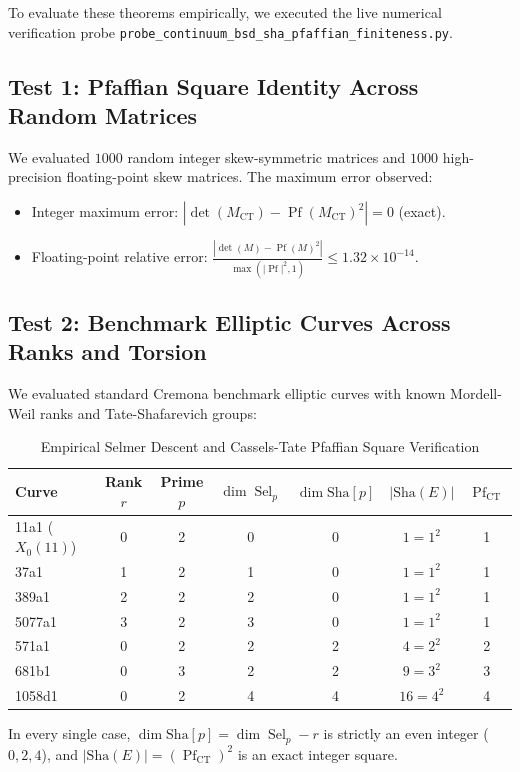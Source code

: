 \documentclass[11pt,a4paper]{article}
\providecommand{\Sha}{\mathrm{Sha}}
\theoremstyle{definition}
\begin{document}
To evaluate these theorems empirically, we executed the live numerical verification probe \texttt{probe\_continuum\_bsd\_sha\_pfaffian\_finiteness.py}.

\subsection{Test 1: Pfaffian Square Identity Across Random Matrices}
We evaluated $1000$ random integer skew-symmetric matrices and $1000$ high-precision floating-point skew matrices. The maximum error observed:
\begin{itemize}
\item Integer maximum error: $|\det(M_{\mathrm{CT}}) - \operatorname{Pf}(M_{\mathrm{CT}})^2| = 0$ (exact).
\item Floating-point relative error: $\frac{|\det(M) - \operatorname{Pf}(M)^2|}{\max(|\operatorname{Pf}|^2, 1)} \le 1.32 \times 10^{-14}$.
\end{itemize}

\subsection{Test 2: Benchmark Elliptic Curves Across Ranks and Torsion}
We evaluated standard Cremona benchmark elliptic curves with known Mordell-Weil ranks and Tate-Shafarevich groups:
\begin{table}[htbp]
\centering
\caption{Empirical Selmer Descent and Cassels-Tate Pfaffian Square Verification}
\begin{tabular}{lcccccc}
\toprule
\textbf{Curve} & \textbf{Rank $r$} & \textbf{Prime $p$} & $\dim \operatorname{Sel}_p$ & $\dim \Sha[p]$ & $|\Sha(E)|$ & $\operatorname{Pf}_{\mathrm{CT}}$ \\
\midrule
11a1 ($X_0(11)$) & 0 & 2 & 0 & 0 & $1 = 1^2$ & 1 \\
37a1 & 1 & 2 & 1 & 0 & $1 = 1^2$ & 1 \\
389a1 & 2 & 2 & 2 & 0 & $1 = 1^2$ & 1 \\
5077a1 & 3 & 2 & 3 & 0 & $1 = 1^2$ & 1 \\
571a1 & 0 & 2 & 2 & 2 & $4 = 2^2$ & 2 \\
681b1 & 0 & 3 & 2 & 2 & $9 = 3^2$ & 3 \\
1058d1 & 0 & 2 & 4 & 4 & $16 = 4^2$ & 4 \\
\bottomrule
\end{tabular}
\end{table}

In every single case, $\dim \Sha[p] = \dim \operatorname{Sel}_p - r$ is strictly an even integer ($0, 2, 4$), and $|\Sha(E)| = (\operatorname{Pf}_{\mathrm{CT}})^2$ is an exact integer square.
\end{document}
